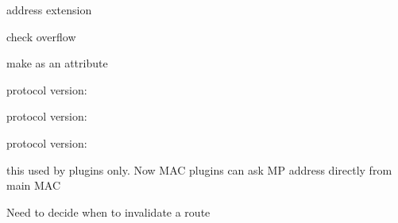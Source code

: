 \begin{DoxyRefList}
\item[\label{todo__todo000116}%
\hypertarget{todo__todo000116}{}%
Member \hyperlink{classns3_1_1dot11s_1_1HwmpProtocolMac_a71929de219e49a7b1c9e8c89e9b8f842}{ns3\+:\+:dot11s\+:\+:Hwmp\+Protocol\+Mac\+:\+:Receive\+Data} (\hyperlink{classns3_1_1Ptr}{Ptr$<$ Packet $>$} packet, const \hyperlink{classns3_1_1WifiMacHeader}{Wifi\+Mac\+Header} \&header)]address extension  
\item[\label{todo__todo000117}%
\hypertarget{todo__todo000117}{}%
Member \hyperlink{classns3_1_1dot11s_1_1IePreq_af0d2802f8e3a2e6526a973e27500e21d}{ns3\+:\+:dot11s\+:\+:Ie\+Preq\+:\+:Add\+Destination\+Address\+Element} (bool do\+Flag, bool rf\+Flag, \hyperlink{classns3_1_1Mac48Address}{Mac48\+Address} dest\+\_\+address, uint32\+\_\+t dest\+\_\+seq\+\_\+number)]check overflow  
\item[\label{todo__todo000118}%
\hypertarget{todo__todo000118}{}%
Member \hyperlink{classns3_1_1dot11s_1_1IePreq_ad3d4a5ee9888f618175e35552b1a84f8}{ns3\+:\+:dot11s\+:\+:Ie\+Preq\+:\+:m\+\_\+max\+Size} ]make as an attribute  
\item[\label{todo__todo000120}%
\hypertarget{todo__todo000120}{}%
Member \hyperlink{classns3_1_1dot11s_1_1PeerLinkCloseStart_a737b487597645ea9f6c9026d46564a69}{ns3\+:\+:dot11s\+:\+:Peer\+Link\+Close\+Start\+:\+:Get\+Fields} () const ]protocol version\+:  
\item[\label{todo__todo000121}%
\hypertarget{todo__todo000121}{}%
Member \hyperlink{classns3_1_1dot11s_1_1PeerLinkConfirmStart_a5e0f00ada2498955279791bcf96951f7}{ns3\+:\+:dot11s\+:\+:Peer\+Link\+Confirm\+Start\+:\+:Get\+Fields} () const ]protocol version\+:  
\item[\label{todo__todo000119}%
\hypertarget{todo__todo000119}{}%
Member \hyperlink{classns3_1_1dot11s_1_1PeerLinkOpenStart_ac3e040a1cfd4bdd2f4d7aa9d596f3c50}{ns3\+:\+:dot11s\+:\+:Peer\+Link\+Open\+Start\+:\+:Get\+Fields} () const ]protocol version\+:  
\item[\label{todo__todo000122}%
\hypertarget{todo__todo000122}{}%
Member \hyperlink{classns3_1_1dot11s_1_1PeerManagementProtocol_ad3f24d945eaeec61d5a76598bf655484}{ns3\+:\+:dot11s\+:\+:Peer\+Management\+Protocol\+:\+:Get\+Address} ()]this used by plugins only. Now M\+AC plugins can ask MP address directly from main M\+AC 
\item[\label{todo__todo000013}%
\hypertarget{todo__todo000013}{}%
Member \hyperlink{classns3_1_1dsdv_1_1RoutingTable_ad4e2b213772381511453c5ec8c968e68}{ns3\+:\+:dsdv\+:\+:Routing\+Table\+:\+:Purge} (std\+::map$<$ Ipv4\+Address, Routing\+Table\+Entry $>$ \&removed\+Addresses)]Need to decide when to invalidate a route  

\end{DoxyRefList}
